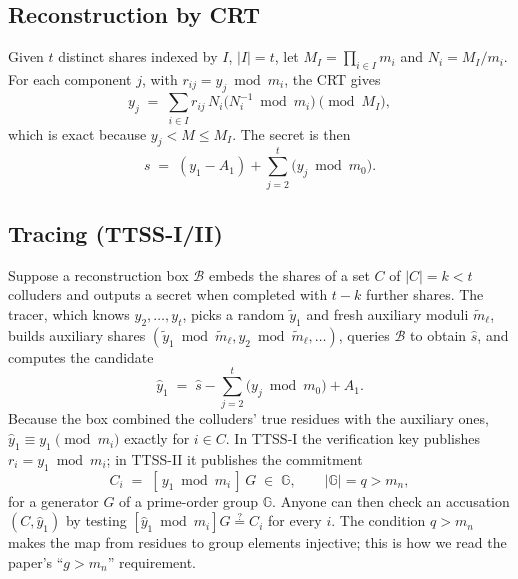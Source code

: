 \documentclass[conference]{IEEEtran}
\begin{document}
\subsection{Reconstruction by CRT}
Given $t$ distinct shares indexed by $I$, $|I|=t$, let $M_I=\prod_{i\in I} m_i$ and $N_i = M_I/m_i$. For each component $j$, with $r_{ij} = y_j \bmod m_i$, the CRT gives
\begin{equation}
  y_j \;=\; \sum_{i\in I} r_{ij}\, N_i \bigl(N_i^{-1} \bmod m_i\bigr) \pmod{M_I},
  \label{eq:crt}
\end{equation}
which is exact because $y_j < M \le M_I$. The secret is then
\begin{equation}
  s \;=\; (y_1 - A_1) + \sum_{j=2}^{t} \bigl(y_j \bmod m_0\bigr).
  \label{eq:rec}
\end{equation}

\subsection{Tracing (TTSS-I/II)}
Suppose a reconstruction box $\mathcal{B}$ embeds the shares of a set $C$ of $|C| = k < t$ colluders and outputs a secret when completed with $t-k$ further shares. The tracer, which knows $y_2,\dots,y_t$, picks a random $\tilde{y}_1$ and fresh auxiliary moduli $\tilde m_\ell$, builds auxiliary shares $(\tilde y_1 \bmod \tilde m_\ell, y_2 \bmod \tilde m_\ell, \dots)$, queries $\mathcal{B}$ to obtain $\hat s$, and computes the candidate
\begin{equation}
  \hat{y}_1 \;=\; \hat{s} - \sum_{j=2}^{t} \bigl(y_j \bmod m_0\bigr) + A_1 .
  \label{eq:trace}
\end{equation}
Because the box combined the colluders' true residues with the auxiliary ones, $\hat y_1 \equiv y_1 \pmod{m_i}$ exactly for $i\in C$. In TTSS-I the verification key publishes $r_i = y_1 \bmod m_i$; in TTSS-II it publishes the commitment
\begin{equation}
  C_i \;=\; [\,y_1 \bmod m_i\,]\,G \;\in\; \mathbb{G}, \qquad |\mathbb{G}| = q > m_n ,
  \label{eq:commit}
\end{equation}
for a generator $G$ of a prime-order group $\mathbb{G}$. Anyone can then check an accusation $(C,\hat y_1)$ by testing $[\hat y_1 \bmod m_i]G \stackrel{?}{=} C_i$ for every $i$. The condition $q>m_n$ makes the map from residues to group elements injective; this is how we read the paper's ``$g>m_n$'' requirement.

\end{document}
